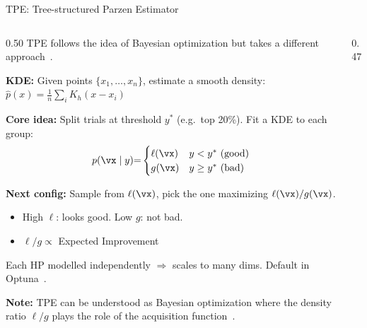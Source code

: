 \begin{frame}{TPE: Tree-structured Parzen Estimator}

  \begin{columns}[T]
    \begin{column}{0.50\textwidth}
      TPE follows the idea of Bayesian optimization but takes a different approach~\cite{bergstra2011algorithms}.

      \vspace{0.2em}
      \textbf{KDE:} Given points $\{x_1, \ldots, x_n\}$, estimate a smooth density:
      $\hat{p}(x) = \frac{1}{n} \sum_{i} K_h(x - x_i)$

      \vspace{0.3em}
      \textbf{Core idea:} Split trials at threshold $y^*$ (e.g.\ top 20\%). Fit a KDE to each group:
      \[
        p(\vx \mid y) {=} \begin{cases}
          \ell(\vx) & y < y^* ~ \text{(good)} \\
          g(\vx)    & y \geq y^* ~ \text{(bad)}
        \end{cases}
      \]

      \vspace{0.2em}
      \textbf{Next config:} Sample from $\ell(\vx)$, pick the one maximizing $\ell(\vx) / g(\vx)$.
      \begin{itemize}
        \item High $\ell$: looks good. Low $g$: not bad.
        \item $\ell/g \propto$ Expected Improvement
      \end{itemize}

      \vspace{0.2em}
      {\small Each HP modelled independently $\Rightarrow$ scales to many dims. Default in Optuna~\cite{akiba2019optuna}.}

      \vspace{0.2em}
      {\small \textbf{Note:} TPE can be understood as Bayesian optimization where the density ratio $\ell/g$ plays the role of the acquisition function~\cite{snoek2012practical}.}
    \end{column}
    \begin{column}{0.47\textwidth}
      \begin{center}
\end{center}
\end{column}
\end{columns}
\end{frame}

